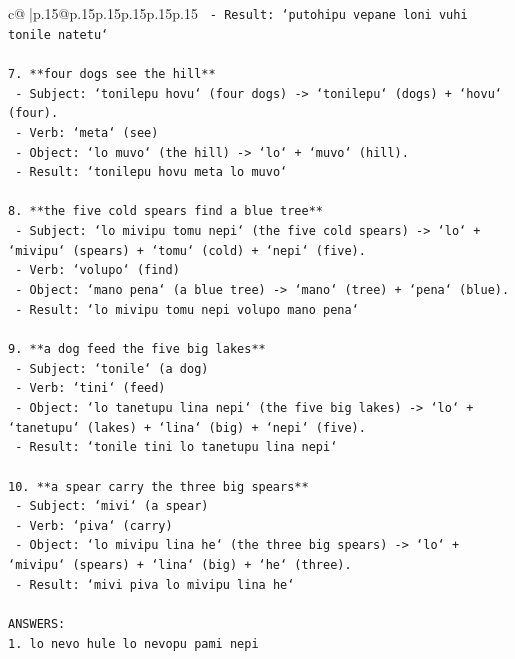 \documentclass{article}
\begin{document}
{\begin{supertabular}{c@{$\;$}|p{.15\linewidth}@{}p{.15\linewidth}p{.15\linewidth}p{.15\linewidth}p{.15\linewidth}p{.15\linewidth}}
{{{\texttt{   {-} Result: `putohipu vepane loni vuhi tonile natetu`} \\
\\ 
\texttt{7. **four dogs see the hill**} \\
\texttt{   {-} Subject: `tonilepu hovu` (four dogs) {-}> `tonilepu` (dogs) + `hovu` (four).} \\
\texttt{   {-} Verb: `meta` (see)} \\
\texttt{   {-} Object: `lo muvo` (the hill) {-}> `lo` + `muvo` (hill).} \\
\texttt{   {-} Result: `tonilepu hovu meta lo muvo`} \\
\\ 
\texttt{8. **the five cold spears find a blue tree**} \\
\texttt{   {-} Subject: `lo mivipu tomu nepi` (the five cold spears) {-}> `lo` + `mivipu` (spears) + `tomu` (cold) + `nepi` (five).} \\
\texttt{   {-} Verb: `volupo` (find)} \\
\texttt{   {-} Object: `mano pena` (a blue tree) {-}> `mano` (tree) + `pena` (blue).} \\
\texttt{   {-} Result: `lo mivipu tomu nepi volupo mano pena`} \\
\\ 
\texttt{9. **a dog feed the five big lakes**} \\
\texttt{   {-} Subject: `tonile` (a dog)} \\
\texttt{   {-} Verb: `tini` (feed)} \\
\texttt{   {-} Object: `lo tanetupu lina nepi` (the five big lakes) {-}> `lo` + `tanetupu` (lakes) + `lina` (big) + `nepi` (five).} \\
\texttt{   {-} Result: `tonile tini lo tanetupu lina nepi`} \\
\\ 
\texttt{10. **a spear carry the three big spears**} \\
\texttt{    {-} Subject: `mivi` (a spear)} \\
\texttt{    {-} Verb: `piva` (carry)} \\
\texttt{    {-} Object: `lo mivipu lina he` (the three big spears) {-}> `lo` + `mivipu` (spears) + `lina` (big) + `he` (three).} \\
\texttt{    {-} Result: `mivi piva lo mivipu lina he`} \\
\\ 
\texttt{ANSWERS:} \\
\texttt{1. lo nevo hule lo nevopu pami nepi} \\
}}}
\end{supertabular}}
\end{document}
